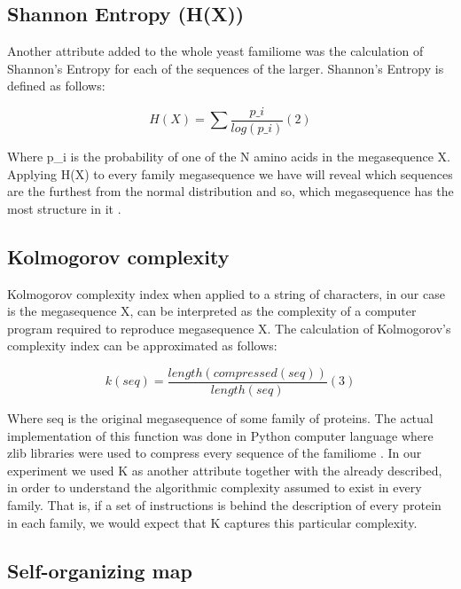 \documentclass[preprint,12pt]{elsarticle}
\begin{document}
\subsection{Shannon Entropy (H(X))}
Another attribute added to the whole yeast familiome was the calculation of Shannon’s Entropy for each of the sequences of the larger. Shannon’s Entropy is defined as follows:

\[
H(X) = \sum{ \dfrac{p\_i}{log(p\_i)}}       (2)
\]

Where p\_i is the probability of one of the N amino acids in the megasequence X. Applying H(X) to every family megasequence we have will reveal which sequences are the furthest from the normal distribution and so, which megasequence has the most structure in it \cite{alberts1925adami}.

\subsection{Kolmogorov complexity}

Kolmogorov complexity index when applied to a string of characters, in our case is the megasequence X, can be interpreted as the complexity of a computer program required to reproduce megasequence X. The calculation of Kolmogorov’s complexity index can be approximated as follows:

\[
k(seq) = {\dfrac{length(compressed(seq))}{length(seq)}} (3)
\]

Where seq is the original megasequence of some family of proteins. The actual implementation of this function was done in Python computer language where zlib libraries were used to compress every sequence of the familiome \cite{li1989kolmogorov}.
In our experiment we used K as another attribute together with the already described, in order to understand the algorithmic complexity assumed to exist in every family. That is, if a set of instructions is behind the description of every protein in each family, we would expect that K captures this particular complexity.


\subsection{Self-organizing map}
\end{document}
